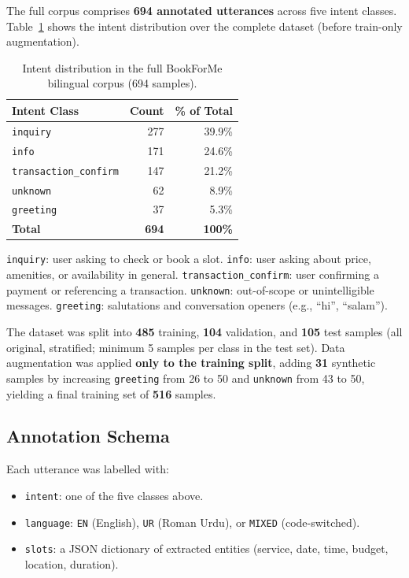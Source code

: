 The full corpus comprises \textbf{694 annotated utterances} across five intent
classes. Table~\ref{tab:data-dist} shows the intent distribution over the complete
dataset (before train-only augmentation).

\begin{table}[H]
\centering
\caption{Intent distribution in the full BookForMe bilingual corpus (694 samples).}
\label{tab:data-dist}
\begin{tabularx}{0.7\textwidth}{Xrr}
\toprule
\textbf{Intent Class} & \textbf{Count} & \textbf{\% of Total} \\
\midrule
\texttt{inquiry}              & 277 & 39.9\% \\
\texttt{info}                 & 171 & 24.6\% \\
\texttt{transaction\_confirm} & 147 & 21.2\% \\
\texttt{unknown}              &  62 &  8.9\% \\
\texttt{greeting}             &  37 &  5.3\% \\
\hline
\textbf{Total}                & \textbf{694} & \textbf{100\%} \\
\bottomrule
\end{tabularx}
\end{table}

\noindent \texttt{inquiry}: user asking to check or book a slot.
\texttt{info}: user asking about price, amenities, or availability in general.
\texttt{transaction\_confirm}: user confirming a payment or referencing a transaction.
\texttt{unknown}: out-of-scope or unintelligible messages.
\texttt{greeting}: salutations and conversation openers (e.g., ``hi'', ``salam'').

The dataset was split into \textbf{485} training, \textbf{104} validation, and
\textbf{105} test samples (all original, stratified; minimum 5 samples per class in
the test set). Data augmentation was applied \textbf{only to the training split},
adding \textbf{31} synthetic samples by increasing \texttt{greeting} from 26 to 50 and
\texttt{unknown} from 43 to 50, yielding a final training set of \textbf{516}
samples.

\subsection{Annotation Schema}

Each utterance was labelled with:
\begin{itemize}
  \item \texttt{intent}: one of the five classes above.
  \item \texttt{language}: \texttt{EN} (English), \texttt{UR} (Roman Urdu),
        or \texttt{MIXED} (code-switched).
  \item \texttt{slots}: a JSON dictionary of extracted entities (service, date,
        time, budget, location, duration).
\end{itemize}

